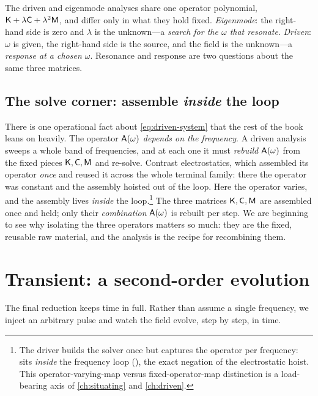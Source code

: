 \begin{keyidea}
The driven and eigenmode analyses share one operator polynomial,
$\mathsf{K}+\lambda\mathsf{C}+\lambda^2\mathsf{M}$, and differ only in what they hold fixed.
\emph{Eigenmode}: the right-hand side is zero and $\lambda$ is the unknown---a
\emph{search for the $\omega$ that resonate}. \emph{Driven}: $\omega$ is given,
the right-hand side is the source, and the field is the unknown---a
\emph{response at a chosen $\omega$}. Resonance and response are two questions
about the same three matrices.
\end{keyidea}

\subsection{The solve corner: assemble \emph{inside} the loop}

There is one operational fact about \cref{eq:driven-system} that the rest of the
book leans on heavily. The operator $\mathsf{A}(\omega)$ \emph{depends on the
frequency}. A driven analysis sweeps a whole band of frequencies, and at each one
it must \emph{rebuild} $\mathsf{A}(\omega)$ from the fixed pieces $\mathsf{K},\mathsf{C},\mathsf{M}$ and
re-solve. Contrast electrostatics, which assembled its operator \emph{once} and
reused it across the whole terminal family: there the operator was constant and
the assembly hoisted out of the loop. Here the operator varies, and the assembly
lives \emph{inside} the loop.\footnote{The driver builds the solver once but
captures the operator per frequency:  sits
\emph{inside} the frequency loop (),
the exact negation of the electrostatic hoist. This operator-varying-map versus
fixed-operator-map distinction is a load-bearing axis of \cref{ch:situating} and
\cref{ch:driven}.} The three matrices $\mathsf{K},\mathsf{C},\mathsf{M}$ are assembled once and
held; only their \emph{combination} $\mathsf{A}(\omega)$ is rebuilt per step. We are
beginning to see why isolating the three operators matters so much: they are the
fixed, reusable raw material, and the analysis is the recipe for recombining
them.

\section{Transient: a second-order evolution}
\label{sec:transient}

The final reduction keeps time in full. Rather than assume a single frequency, we
inject an arbitrary pulse and watch the field evolve, step by step, in time.

